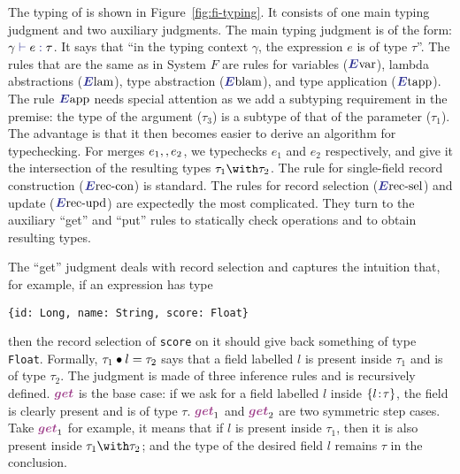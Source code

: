 The typing of \name is shown in Figure~\ref{fig:fi-typing}. It consists of one
main typing judgment and two auxiliary judgments. The main typing judgment is of
the form: $ \judgee \gamma e \tau $. It says that ``in the typing context
$\gamma$, the expression $e$ is of type $\tau$''. The rules that are the same as
in System $F$ are rules for variables ($\rulelabelevar$), lambda abstractions
($\rulelabelelam$), type abstraction ($\rulelabeleblam$), and type application
($\rulelabeletapp$). The rule $\rulelabeleapp$ needs special attention as we add
a subtyping requirement in the premise: the type of the argument ($\tau_3$) is a
subtype of that of the parameter ($\tau_1$). The advantage is that it then
becomes easier to derive an algorithm for typechecking. For merges
$e_1 ,, e_2$, we typechecks $e_1$ and $e_2$ respectively, and give it the
intersection of the resulting types $\tau_1 \andop \tau_2$. The rule for
single-field record construction ($\rulelabelereccon$) is standard. The rules
for record selection ($\rulelabelerecsel$) and update ($\rulelabelerecupd$) are
expectedly the most complicated. They turn to the auxiliary ``get'' and ``put''
rules to statically check operations and to obtain resulting types.

The ``get'' judgment deals with record selection and captures the intuition
that, for example, if an expression has type
\begin{lstlisting}
{id: Long, name: String, score: Float}
\end{lstlisting}
then the record selection of \lstinline$score$ on it should give back something
of type \lstinline$Float$. Formally, $\tau_1 \bullet l = \tau_2$ says that a
field labelled $l$ is present inside $\tau_1$ and is of type $\tau_2$. The
judgment is made of three inference rules and is recursively defined.
$\rulelabelget$ is the base case: if we ask for a field labelled $l$ inside
$\{ l \!:\! \tau \}$, the field is clearly present and is of type $\tau$.
$\rulelabelgetleft$ and $\rulelabelgetright$ are two symmetric step cases. Take
$\rulelabelgetleft$ for example, it means that if $l$ is present inside
$\tau_1$, then it is also present inside $\tau_1 \andop \tau_2$; and the type of
the desired field $l$ remains $\tau$ in the conclusion.

